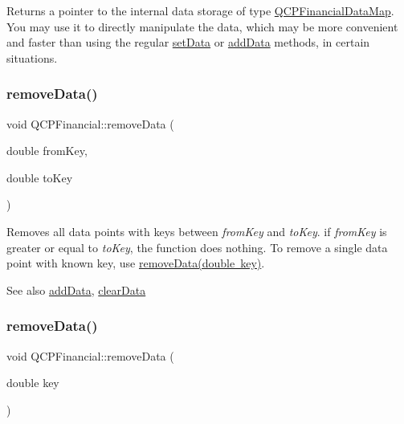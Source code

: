 Returns a pointer to the internal data storage of type \mbox{\hyperlink{qcustomplot_8h_a745c09823fae0974b50beca9bc3b3d7d}{Q\+C\+P\+Financial\+Data\+Map}}. You may use it to directly manipulate the data, which may be more convenient and faster than using the regular \mbox{\hyperlink{class_q_c_p_financial_adf12a86082f1e488df6a4e8603f8fd6d}{set\+Data}} or \mbox{\hyperlink{class_q_c_p_financial_a1a83396f97fcc68f2b7aa8d9782feffe}{add\+Data}} methods, in certain situations. \mbox{\label{class_q_c_p_financial_a048c741d3c8cc5709c2c44b759fdf27c}} 
\subsubsection{\texorpdfstring{remove\+Data()}{removeData()}\hspace{0.1cm}{\footnotesize\ttfamily [1/2]}}
{\footnotesize\ttfamily void Q\+C\+P\+Financial\+::remove\+Data (\begin{DoxyParamCaption}\item[{double}]{from\+Key,  }\item[{double}]{to\+Key }\end{DoxyParamCaption})}

Removes all data points with keys between {\itshape from\+Key} and {\itshape to\+Key}. if {\itshape from\+Key} is greater or equal to {\itshape to\+Key}, the function does nothing. To remove a single data point with known key, use \mbox{\hyperlink{class_q_c_p_financial_ae527d8a11290906b083d1ab598c380ea}{remove\+Data(double key)}}.

\begin{DoxySeeAlso}{See also}
\mbox{\hyperlink{class_q_c_p_financial_a1a83396f97fcc68f2b7aa8d9782feffe}{add\+Data}}, \mbox{\hyperlink{class_q_c_p_financial_a11fd49928c33e55e27b7319c6927864a}{clear\+Data}} 
\end{DoxySeeAlso}
\mbox{\label{class_q_c_p_financial_ae527d8a11290906b083d1ab598c380ea}} 
\subsubsection{\texorpdfstring{remove\+Data()}{removeData()}\hspace{0.1cm}{\footnotesize\ttfamily [2/2]}}
{\footnotesize\ttfamily void Q\+C\+P\+Financial\+::remove\+Data (\begin{DoxyParamCaption}\item[{double}]{key }\end{DoxyParamCaption})}

